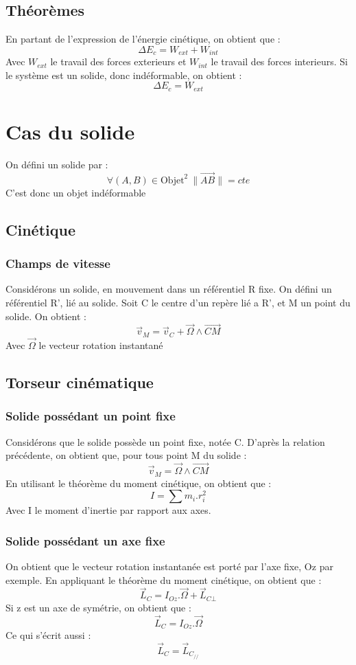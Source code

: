 \subsection{Théorèmes}
\begin{prop}
En partant de l'expression de l'énergie cinétique, on obtient que :
$$\Delta E_c = W_{ext} + W_{int}$$
Avec $W_{ext}$ le travail des forces exterieurs et $W_{int}$ le travail des forces interieurs. Si le système est un solide, donc indéformable, on obtient : 
$$\Delta E_c = W_{ext}$$
\end{prop}
\section{Cas du solide}
\begin{de}
On défini un solide par : 
$$\forall (A,B) \in \mbox{Objet}^2~ \parallel\overrightarrow{AB}\parallel = cte$$
C'est donc un objet indéformable
\end{de}
\subsection{Cinétique}
\subsubsection{Champs de vitesse}
Considérons un solide, en mouvement dans un référentiel R fixe. On défini un référentiel R', lié au solide. Soit C le centre d'un repère lié a R', et M un point du solide. On obtient : 
$$\overrightarrow{v}_M = \overrightarrow{v}_C + \overrightarrow{\Omega}\wedge\overrightarrow{CM}$$
Avec $\overrightarrow{\Omega}$ le vecteur rotation instantané
\subsection{Torseur cinématique}
\subsubsection{Solide possédant un point fixe}
Considérons que le solide possède un point fixe, notée C. D'après la relation précédente, on obtient que, pour tous point M du solide :
$$ \overrightarrow{v}_M = \overrightarrow{\Omega}\wedge\overrightarrow{CM}$$
En utilisant le théorème du moment cinétique, on obtient que :
$$I = \sum m_i.r_i^2$$
Avec I le moment d'inertie par rapport aux axes.
\subsubsection{Solide possédant un axe fixe}
On obtient que le vecteur rotation instantanée est porté par l'axe fixe, Oz par exemple. En appliquant le théorème du moment cinétique, on obtient que :
$$\overrightarrow{L}_C = I_{Oz}.\overrightarrow{\Omega} + \overrightarrow{L}_{C\bot}$$
Si z est un axe de symétrie, on obtient que : 
$$\overrightarrow{L}_C = I_{Oz}.\overrightarrow{\Omega}$$
Ce qui s'écrit aussi : 
$$\overrightarrow{L}_C = \overrightarrow{L}_{C_{//}}$$
